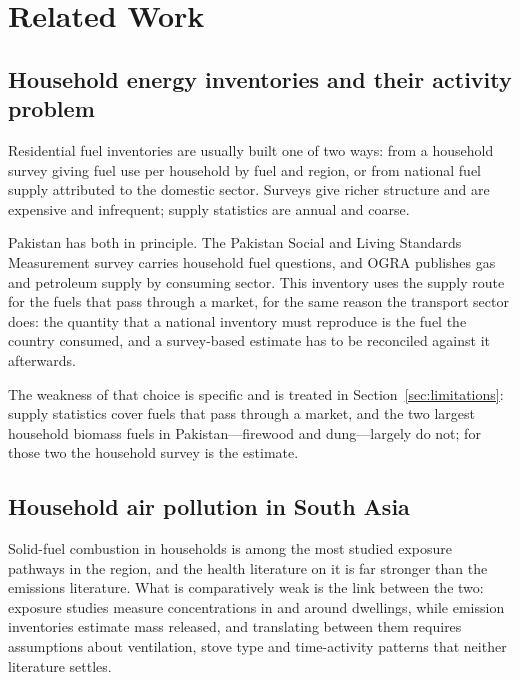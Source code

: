 \section{Related Work}
\label{sec:related}

\subsection{Household energy inventories and their activity problem}

Residential fuel inventories are usually built one of two ways: from a household survey giving
fuel use per household by fuel and region, or from national fuel supply attributed to the
domestic sector. Surveys give richer structure and are expensive and infrequent; supply
statistics are annual and coarse.

Pakistan has both in principle. The Pakistan Social and Living Standards Measurement survey
carries household fuel questions, and OGRA publishes gas and petroleum supply by consuming
sector. This inventory uses the supply route for the fuels that pass through a market, for the
same reason the transport sector does:
the quantity that a national inventory must reproduce is the fuel the country consumed, and a
survey-based estimate has to be reconciled against it afterwards.

The weakness of that choice is specific and is treated in Section~\ref{sec:limitations}: supply
statistics cover fuels that pass through a market, and the two largest household biomass fuels in
Pakistan---firewood and dung---largely do not; for those two the household survey is the estimate.

\subsection{Household air pollution in South Asia}

Solid-fuel combustion in households is among the most studied exposure pathways in the region,
and the health literature on it is far stronger than the emissions literature. What is
comparatively weak is the link between the two: exposure studies measure concentrations in
and around dwellings, while emission inventories estimate mass released, and translating
between them requires assumptions about ventilation, stove type and time-activity patterns
that neither literature settles.

